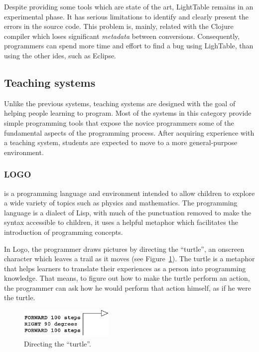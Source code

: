 Despite providing some tools which are state of the art, LightTable remains in an experimental phase. It has serious limitations to identify and clearly present the errors in the source code. This problem is, mainly, related with the Clojure compiler which loses significant \textit{metadata} between conversions. Consequently, programmers can spend more time and effort to find a bug using LighTable, than using the other \ac{ide}s, such as Eclipse.
\subsection{Teaching systems}
\label{sec:ts}

Unlike the previous systems, teaching systems are designed with the goal of helping people learning to program. Most of the systems in this category provide simple programming tools that expose the novice programmers some of the fundamental aspects of the programming process. After acquiring experience with a teaching system, students are expected to move to a more general-purpose environment. 

\subsubsection{LOGO~\cite{papert1980mindstorms}} is a programming language and environment intended to allow children to explore a wide variety of topics such as physics and mathematics. The programming language is a dialect of Lisp, with much of the punctuation removed to make the syntax accessible to children, it uses a helpful metaphor which facilitates the introduction of programming concepts.

In Logo, the programmer draws pictures by directing the ``turtle'', an onscreen character which leaves a trail as it moves (see Figure~\ref{fig:turtle}). The turtle is a metaphor that helps learners to translate their experiences as a person into programming knowledge. That means, to figure out how to make the turtle perform an action, the programmer can ask how he would perform that action himself, as if he were the turtle.

\begin{figure}
  \vspace{-40pt}
  \begin{center}
    \includegraphics[width=0.4\textwidth]{img/turtle}
  \end{center}
  \vspace{-15pt}
 \caption{Directing the ``turtle''.}  
  \vspace{-20pt}
    \label{fig:turtle}
\end{figure}

